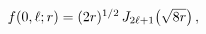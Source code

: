 $\mathop{f\/}\nolimits\!\left(0,\ell;r\right)=(2r)^{1/2}\mathop{J_{2\ell+1}\/}%
\nolimits\!\left(\sqrt{8r}\right),$